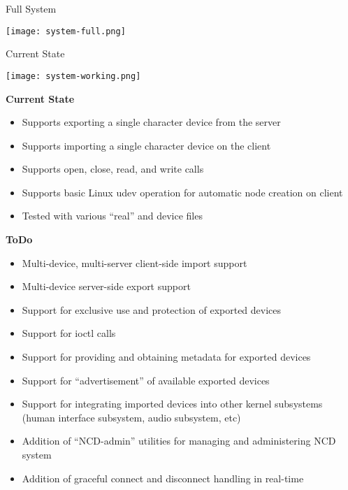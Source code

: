 \documentclass[handout]{beamer}
\begin{document}
\begin{frame}[c]{Full System}
  \begin{center}
    \texttt{[image: system-full.png]}
  \end{center}
\end{frame}

\begin{frame}[c]{Current State}
  \begin{center}
    \texttt{[image: system-working.png]}
  \end{center}
\end{frame}

\begin{frame}{\bf Current State}

  \begin{itemize}
  \item<1-> Supports exporting a single character device from the server
  \item<2-> Supports importing a single character device on the client
  \item<3-> Supports open, close, read, and write calls
  \item<4-> Supports basic Linux udev operation for automatic node
    creation on client
  \item<5-> Tested with various ``real'' and device files
  \end{itemize}

\end{frame}

\begin{frame}{\bf ToDo}

\begin{itemize}
\item<1-> Multi-device, multi-server client-side import support
\item<2-> Multi-device server-side export support
\item<3-> Support for exclusive use and protection of exported devices
\item<4-> Support for ioctl calls
\item<5-> Support for providing and obtaining metadata for exported
  devices
\item<6-> Support for ``advertisement'' of available exported devices
\item<7-> Support for integrating imported devices into other kernel
  subsystems (human interface subsystem, audio subsystem, etc)
\item<8-> Addition of ``NCD-admin'' utilities for managing and administering
  NCD system
\item<9-> Addition of graceful connect and disconnect handling in real-time
\end{itemize}

\end{frame}
\end{document}
